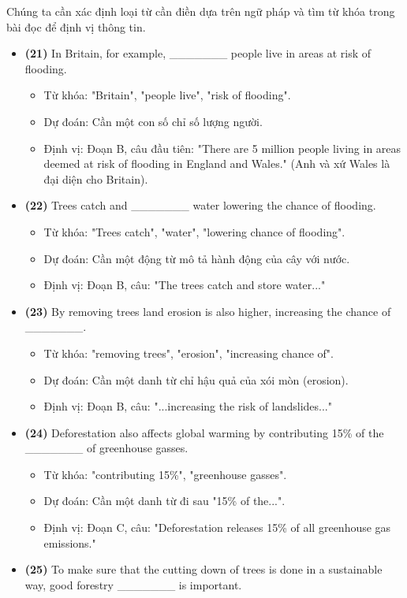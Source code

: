 \documentclass{../templateReading/cdreading}
\begin{document}
Chúng ta cần xác định loại từ cần điền dựa trên ngữ pháp và tìm từ khóa trong bài đọc để định vị thông tin.
\begin{itemize}
\item \textbf{(21)} In Britain, for example, \_\_\_\_\_\_\_ people live in areas at risk of flooding.
\begin{itemize}
\item Từ khóa: "Britain", "people live", "risk of flooding".
\item Dự đoán: Cần một con số chỉ số lượng người.
\item Định vị: Đoạn B, câu đầu tiên: "There are 5 million people living in areas deemed at risk of flooding in England and Wales." (Anh và xứ Wales là đại diện cho Britain).
\end{itemize}
\item \textbf{(22)} Trees catch and \_\_\_\_\_\_\_ water lowering the chance of flooding.
\begin{itemize}
\item Từ khóa: "Trees catch", "water", "lowering chance of flooding".
\item Dự đoán: Cần một động từ mô tả hành động của cây với nước.
\item Định vị: Đoạn B, câu: "The trees catch and store water..."
\end{itemize}
\item \textbf{(23)} By removing trees land erosion is also higher, increasing the chance of \_\_\_\_\_\_\_.
\begin{itemize}
\item Từ khóa: "removing trees", "erosion", "increasing chance of".
\item Dự đoán: Cần một danh từ chỉ hậu quả của xói mòn (erosion).
\item Định vị: Đoạn B, câu: "...increasing the risk of landslides..."
\end{itemize}
\item \textbf{(24)} Deforestation also affects global warming by contributing 15\% of the \_\_\_\_\_\_\_ of greenhouse gasses.
\begin{itemize}
\item Từ khóa: "contributing 15\%", "greenhouse gasses".
\item Dự đoán: Cần một danh từ đi sau "15\% of the...".
\item Định vị: Đoạn C, câu: "Deforestation releases 15\% of all greenhouse gas emissions."
\end{itemize}
\item \textbf{(25)} To make sure that the cutting down of trees is done in a sustainable way, good forestry \_\_\_\_\_\_\_ is important.

\end{itemize}
\end{document}
